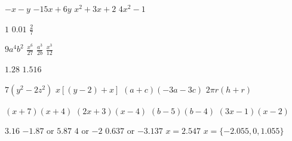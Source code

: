  \begin{Answer}[ref={ex11}]
 		\Question %
 	\begin{tasks}
 		\task 	 $-x -y $ 
 		\task    $-15x+6y $
 		\task 	 $x^{2} +3 x +2$
 		\task    $4 x^{2} -1$
 	\end{tasks}
 	
 	\Question %
 	\begin{tasks}
 		\task 	 $1$
 		\task    $0.01$
 		\task 36.462
 		\task $\frac{2}{7}$
 	\end{tasks}
 \Question %
 \begin{tasks}
 	\task 	 $9 a^{4} b^{2}$
 	\task    $\frac{x^{6}}{27}$
 	\task 	$\frac{a^3}{2b}$
 	\task	$\frac{x^3}{12}$
 \end{tasks}
 \Question %
\begin{tasks}
	\task 	 $1.28$
	\task    $1.516$
\end{tasks}
\Question %
\begin{tasks}
	\task 	$7(y^2-2z^2)$ 
	\task  $x[(y-2)+x]$
	\task $(a+c)(-3a-3c)$
	\task $2\pi r(h+r)$
\end{tasks}
\Question %
\begin{tasks}
	\task 	 $\left (x +7\right ) \left (x +4\right )$
	\task    $\left (2 x +3\right ) \left (x -4\right )$
	\task	$(b-5)(b-4)$
	\task	$(3x-1)(x-2)$
\end{tasks}
\Question %
\begin{tasks}
	\task 	$3.16$
	\task   $ -1.87$ or $5.87$
	\task 	$4$ or $ -2$
	\task   $0.637$ or $ -3.137$ 
	\task 	$x=2.547$
	\task 	$x=\{-2.055,0,1.055\}$
\end{tasks}
 \end{Answer}
